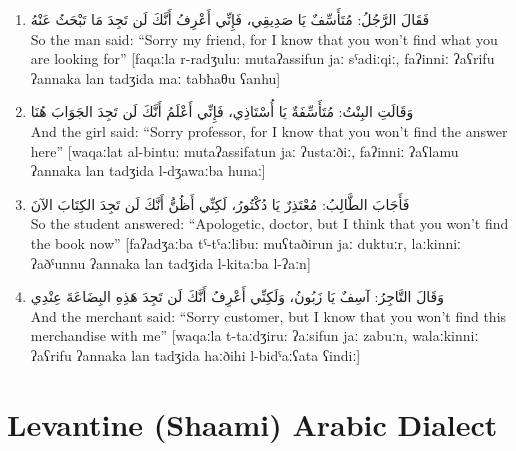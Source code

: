 \documentclass[letterpaper,12pt]{article}
\begin{document}
\begin{enumerate}
\item \textarabic{فَقَالَ الرَّجُلُ: مُتَأَسِّفٌ يَا صَدِيقِي، فَإِنِّي أَعْرِفُ أَنَّكَ لَن تَجِدَ مَا تَبْحَثُ عَنْهُ}\\
So the man said: ``Sorry my friend, for I know that you won't find what you are looking for'' [faqaːla r-radʒulu: mutaʔassifun jaː sˤadiːqiː, faʔinniː ʔaʕrifu ʔannaka lan tadʒida maː tabħaθu ʕanhu]

\item \textarabic{وَقَالَتِ البِنْتُ: مُتَأَسِّفَةٌ يَا أُسْتَاذِي، فَإِنِّي أَعْلَمُ أَنَّكَ لَن تَجِدَ الجَوَابَ هُنَا}\\
And the girl said: ``Sorry professor, for I know that you won't find the answer here'' [waqaːlat al-bintu: mutaʔassifatun jaː ʔustaːðiː, faʔinniː ʔaʕlamu ʔannaka lan tadʒida l-dʒawaːba hunaː]

\item \textarabic{فَأَجَابَ الطَّالِبُ: مُعْتَذِرٌ يَا دُكْتُورُ، لَكِنِّي أَظُنُّ أَنَّكَ لَن تَجِدَ الكِتَابَ الآنَ}\\
So the student answered: ``Apologetic, doctor, but I think that you won't find the book now'' [faʔadʒaːba tˤ-tˤaːlibu: muʕtaðirun jaː duktuːr, laːkinniː ʔaðˤunnu ʔannaka lan tadʒida l-kitaːba l-ʔaːn]

\item \textarabic{وَقَالَ التَّاجِرُ: آسِفٌ يَا زَبُونُ، وَلَكِنِّي أَعْرِفُ أَنَّكَ لَن تَجِدَ هَذِهِ البِضَاعَةَ عِنْدِي}\\
And the merchant said: ``Sorry customer, but I know that you won't find this merchandise with me'' [waqaːla t-taːdʒiru: ʔaːsifun jaː zabuːn, walaːkinniː ʔaʕrifu ʔannaka lan tadʒida haːðihi l-bidˤaːʕata ʕindiː]
\end{enumerate}

\section{Levantine (Shaami) Arabic Dialect}
\end{document}
